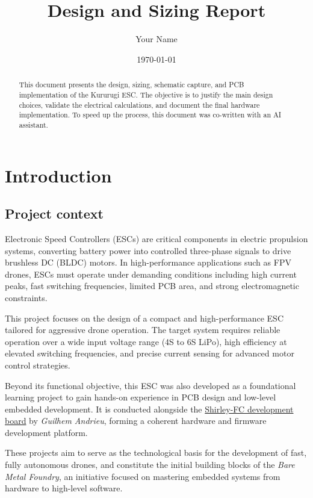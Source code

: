 \documentclass[11pt,a4paper]{article}
\title{\textbf{\projectname}\\Design and Sizing Report}
\author{Your Name}
\date{\today}
\newcommand{\projectname}{Kururugi ESC}
\begin{document}
\maketitle
\tableofcontents
\newpage

\begin{abstract}
This document presents the design, sizing, schematic capture, and PCB implementation of the \projectname.
The objective is to justify the main design choices, validate the electrical calculations, and document the final hardware implementation. To speed up the process, this document was co-written with an AI assistant.
\end{abstract}

\section{Introduction}
\label{sec:introduction}

\subsection{Project context}

Electronic Speed Controllers (ESCs) are critical components in electric propulsion systems, converting battery power into controlled three-phase signals to drive brushless DC (BLDC) motors. In high-performance applications such as FPV drones, ESCs must operate under demanding conditions including high current peaks, fast switching frequencies, limited PCB area, and strong electromagnetic constraints.

This project focuses on the design of a compact and high-performance ESC tailored for aggressive drone operation. The target system requires reliable operation over a wide input voltage range (4S to 6S LiPo), high efficiency at elevated switching frequencies, and precise current sensing for advanced motor control strategies.

Beyond its functional objective, this ESC was also developed as a foundational learning project to gain hands-on experience in PCB design and low-level embedded development. It is conducted alongside the \href{https://github.com/Gui-arain/Shirley-FC-Dev-Board/tree/main/resources}{Shirley-FC development board} by \textit{Guilhem Andrieu}, forming a coherent hardware and firmware development platform.

These projects aim to serve as the technological basis for the development of fast, fully autonomous drones, and constitute the initial building blocks of the \textit{Bare Metal Foundry}, an initiative focused on mastering embedded systems from hardware to high-level software.
\end{document}
